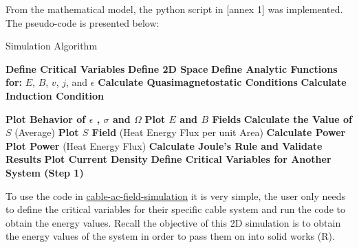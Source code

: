 \label{sec:TheoryToSimulation}
From the mathematical model, the python script in [annex 1] was implemented. The pseudo-code is presented below: 

\begin{algorithm}[H]
\caption{Simulation Algorithm}
\label{alg:simulation}

\begin{algorithmic}[1]
\State \textbf{Define Critical Variables}
\State \textbf{Define 2D Space}
\State \textbf{Define Analytic Functions for:} $E$, $B$, $v$, $j$, and $\epsilon$
\State \textbf{Calculate Quasimagnetostatic Conditions}
\State \textbf{Calculate Induction Condition}

    \State \textbf{Plot Behavior of $\epsilon$ , $\sigma$  and $\Omega$}
    \State \textbf{Plot $E$ and $B$ Fields}
    \State \textbf{Calculate the Value of $S$} (Average)
    \State \textbf{Plot $S$ Field} (Heat Energy Flux per unit Area)
    \State \textbf{Calculate Power}
    \State \textbf{Plot Power} (Heat Energy Flux)
    \State \textbf{Calculate Joule's Rule and Validate Results}
    \State \textbf{Plot Current Density}
\Else
    \State \textbf{Define Critical Variables for Another System (Step 1)}
\EndIf

\end{algorithmic}
\end{algorithm}

To use the code in \href{https://colab.research.google.com/drive/13jeFxGGuYIKkYAF5masezWn5jW-AHsGR?usp=drive_link}{cable-ac-field-simulation} it is very simple, the user only needs to define the critical variables for their specific cable system and run the code to obtain the energy values. Recall the objective of this 2D simulation is to obtain the energy values of the system in order to pass them on into solid works (R). 